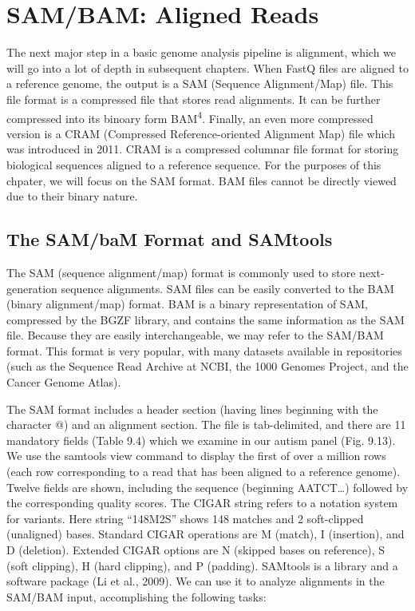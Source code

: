 \documentclass[
  letterpaper,
  DIV=11,
  numbers=noendperiod]{scrreprt}
\begin{document}
\section{SAM/BAM: Aligned Reads}\label{sambam-aligned-reads}

The next major step in a basic genome analysis pipeline is alignment,
which we will go into a lot of depth in subsequent chapters. When FastQ
files are aligned to a reference genome, the output is a SAM (Sequence
Alignment/Map) file. This file format is a compressed file that stores
read alignments. It can be further compressed into its binoary form
BAM\textsuperscript{4}. Finally, an even more compressed version is a
CRAM (Compressed Reference-oriented Alignment Map) file which was
introduced in 2011. CRAM is a compressed columnar file format for
storing biological sequences aligned to a reference sequence. For the
purposes of this chpater, we will focus on the SAM format. BAM files
cannot be directly viewed due to their binary nature.

\subsection{The SAM/baM Format and
SAMtools}\label{the-sambam-format-and-samtools}

The SAM (sequence alignment/map) format is commonly used to store
next-generation sequence alignments. SAM files can be easily converted
to the BAM (binary alignment/map) format. BAM is a binary representation
of SAM, compressed by the BGZF library, and contains the same
information as the SAM file. Because they are easily interchangeable, we
may refer to the SAM/BAM format. This format is very popular, with many
datasets available in repositories (such as the Sequence Read Archive at
NCBI, the 1000 Genomes Project, and the Cancer Genome Atlas).

The SAM format includes a header section (having lines beginning with
the character @) and an alignment section. The file is tab-delimited,
and there are 11 mandatory fields (Table 9.4) which we examine in our
autism panel (Fig. 9.13). We use the samtools view command to display
the first of over a million rows (each row corresponding to a read that
has been aligned to a reference genome). Twelve fields are shown,
including the sequence (beginning AATCT\ldots) followed by the
corresponding quality scores. The CIGAR string refers to a notation
system for variants. Here string ``148M2S'' shows 148 matches and 2
soft-clipped (unaligned) bases. Standard CIGAR operations are M (match),
I (insertion), and D (deletion). Extended CIGAR options are N (skipped
bases on reference), S (soft clipping), H (hard clipping), and P
(padding). SAMtools is a library and a software package (Li et al.,
2009). We can use it to analyze alignments in the SAM/BAM input,
accomplishing the following tasks:
\end{document}
